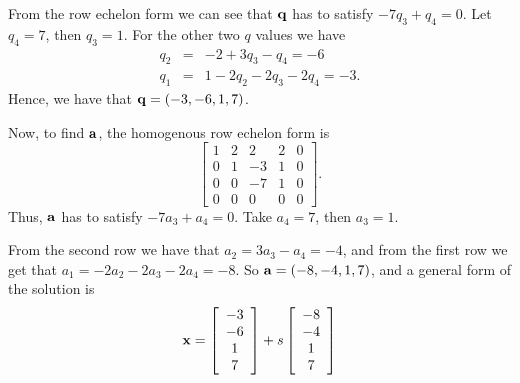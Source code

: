 From the row echelon form we can see that $\qq$ has to satisfy $- 7q_3 + q_4 = 0$. Let $q_4 = 7$, then $q_3 = 1$. For the other two $q$ values we have
\begin{eqnarray*}
  q_2 &=& -2 + 3q_3 - q_4 = -6 \\
	q_1 &=& 1 - 2q_2 - 2q_3 - 2q_4 = -3.
\end{eqnarray*}
Hence, we have that $\qq = (-3, -6, 1, 7)$.

Now, to find $\aa$, the homogenous row echelon form is
$$
\left[\begin{array}{cccc|c}
     1 & 2 & 2 & 2 & 0 \\
		 0 & 1 & -3 & 1 & 0\\
		 0 & 0 & -7 & 1 & 0\\
		 0 & 0 & 0 & 0 & 0
      \end{array}\right].
$$
Thus, $\aa$ has to satisfy $-7a_3 + a_4 = 0$. Take $a_4 = 7$, then $a_3 = 1$.

From the second row we have that $a_2 = 3a_3 - a_4 = -4$, and from the first row we get that $a_1 = -2a_2 - 2a_3 - 2a_4 = -8$. So $\aa = (-8, -4, 1, 7)$, and a general form of the solution is
$$
\xx = \left[\begin{array}{c} -3 \\ -6 \\ 1 \\ 7 \end{array}\right] +
s\left[\begin{array}{c} -8 \\ -4 \\ 1 \\ 7 \end{array}\right]
$$

